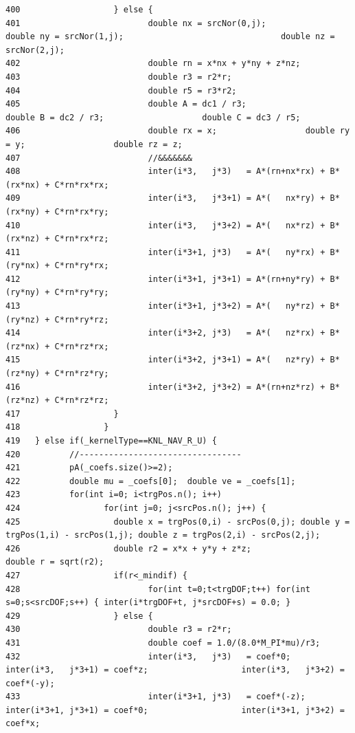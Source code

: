 \begin{verbatim}
400                   } else {
401                          double nx = srcNor(0,j);                                 double ny = srcNor(1,j);                                double nz = srcNor(2,j);
402                          double rn = x*nx + y*ny + z*nz;
403                          double r3 = r2*r;
404                          double r5 = r3*r2;
405                          double A = dc1 / r3;                    double B = dc2 / r3;                    double C = dc3 / r5;
406                          double rx = x;                  double ry = y;                  double rz = z;
407                          //&&&&&&&
408                          inter(i*3,   j*3)   = A*(rn+nx*rx) + B*(rx*nx) + C*rn*rx*rx;
409                          inter(i*3,   j*3+1) = A*(   nx*ry) + B*(rx*ny) + C*rn*rx*ry;
410                          inter(i*3,   j*3+2) = A*(   nx*rz) + B*(rx*nz) + C*rn*rx*rz;
411                          inter(i*3+1, j*3)   = A*(   ny*rx) + B*(ry*nx) + C*rn*ry*rx;
412                          inter(i*3+1, j*3+1) = A*(rn+ny*ry) + B*(ry*ny) + C*rn*ry*ry;
413                          inter(i*3+1, j*3+2) = A*(   ny*rz) + B*(ry*nz) + C*rn*ry*rz;
414                          inter(i*3+2, j*3)   = A*(   nz*rx) + B*(rz*nx) + C*rn*rz*rx;
415                          inter(i*3+2, j*3+1) = A*(   nz*ry) + B*(rz*ny) + C*rn*rz*ry;
416                          inter(i*3+2, j*3+2) = A*(rn+nz*rz) + B*(rz*nz) + C*rn*rz*rz;
417                   }
418                 }
419   } else if(_kernelType==KNL_NAV_R_U) {
420          //---------------------------------
421          pA(_coefs.size()>=2);
422          double mu = _coefs[0];  double ve = _coefs[1];
423          for(int i=0; i<trgPos.n(); i++)
424                 for(int j=0; j<srcPos.n(); j++) {
425                   double x = trgPos(0,i) - srcPos(0,j); double y = trgPos(1,i) - srcPos(1,j); double z = trgPos(2,i) - srcPos(2,j);
426                   double r2 = x*x + y*y + z*z;                    double r = sqrt(r2);
427                   if(r<_mindif) {
428                          for(int t=0;t<trgDOF;t++) for(int s=0;s<srcDOF;s++) { inter(i*trgDOF+t, j*srcDOF+s) = 0.0; }
429                   } else {
430                          double r3 = r2*r;
431                          double coef = 1.0/(8.0*M_PI*mu)/r3;
432                          inter(i*3,   j*3)   = coef*0;                   inter(i*3,   j*3+1) = coef*z;                   inter(i*3,   j*3+2) = coef*(-y);
433                          inter(i*3+1, j*3)   = coef*(-z);                inter(i*3+1, j*3+1) = coef*0;                   inter(i*3+1, j*3+2) = coef*x;

\end{verbatim}
